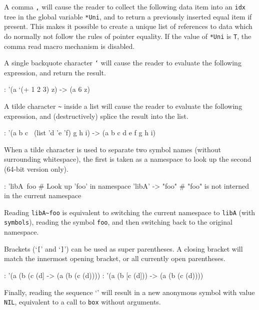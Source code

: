 A comma  \texttt{,}  will cause the reader to collect the following data item
into an \texttt{idx} tree in the global variable \texttt{*Uni}, and to return a
previously inserted equal item if present. This makes it possible to
create a unique list of references to data which do normally not follow
the rules of pointer equality. If the value of \texttt{*Uni} is \texttt{T}, the comma
read macro mechanism is disabled.

A single backquote character \texttt{`} will cause the reader to evaluate the
following expression, and return the result.


\begin{wideverbatim}
: '(a `(+ 1 2 3) z)
-> (a 6 z)
\end{wideverbatim}

A tilde character \texttt{\textasciitilde{}} inside a list will cause the reader to evaluate
the following expression, and (destructively) splice the result into the
list.


\begin{wideverbatim}
: '(a b c ~(list 'd 'e 'f) g h i)
-> (a b c d e f g h i)
\end{wideverbatim}

When a tilde character is used to separate two symbol names (without
surrounding whitespace), the first is taken as a namespace to look up
the second (64-bit version only).


\begin{wideverbatim}
: 'libA~foo  # Look up 'foo' in namespace 'libA'
-> "foo"     # "foo" is not interned in the current namespace
\end{wideverbatim}

Reading \texttt{libA\textasciitilde{}foo} is equivalent to switching the current namespace to
\texttt{libA} (with \texttt{symbols}), reading the symbol \texttt{foo}, and then switching
back to the original namespace.

Brackets (`\texttt{[}' and `\texttt{]}') can be used as super parentheses. A closing
bracket will match the innermost opening bracket, or all currently open
parentheses.


\begin{wideverbatim}
: '(a (b (c (d]
-> (a (b (c (d))))
: '(a (b [c (d]))
-> (a (b (c (d))))
\end{wideverbatim}

Finally, reading the sequence `\texttt{{}}' will result in a new anonymous
symbol with value \texttt{NIL}, equivalent to a call to \texttt{box} without
arguments.



